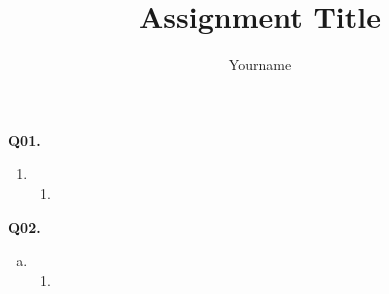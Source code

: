 \documentclass[11pt]{article}
\author{Yourname}
\title{Assignment Title}
\begin{document}
\parindent=0pt
\setlength{\abovedisplayskip}{5pt}
\setlength{\belowdisplayskip}{5pt}
\thispagestyle{firstpage}

\head

\textbf{Q01.}

\begin{enumerate}
    \item 
        \begin{enumerate}
            \item 
        \end{enumerate}
\end{enumerate}

\newpage

\textbf{Q02.}

\begin{enumerate}[a.]
    \item 
        \begin{enumerate}
            \item
        \end{enumerate}
\end{enumerate}
\end{document}
